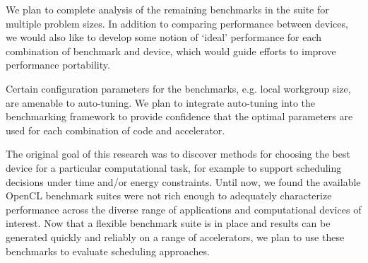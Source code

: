 \documentclass[../document.tex]{subfiles}
\begin{document}
\label{sec:future_work}

We plan to complete analysis of the remaining benchmarks in the suite for multiple problem sizes.
In addition to comparing performance between devices, we would also like to develop some notion of `ideal' performance for each combination of benchmark and device, which would guide efforts to improve performance portability.

Certain configuration parameters for the benchmarks, e.g. local workgroup size, are amenable to auto-tuning.
We plan to integrate auto-tuning into the benchmarking framework to provide confidence that the optimal parameters are used for each combination of code and accelerator.

The original goal of this research was to discover methods for choosing the best device for a particular computational task, for example to support scheduling decisions under time and/or energy constraints.
Until now, we found the available OpenCL benchmark suites were not rich enough to adequately characterize performance across the diverse range of applications and computational devices of interest.
Now that a flexible benchmark suite is in place and results can be generated quickly and reliably on a range of accelerators, we plan to use these benchmarks to evaluate scheduling approaches.
\end{document}
